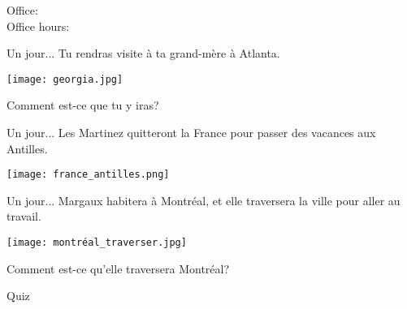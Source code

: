 \documentclass{beamer}
\subtitle[Voyages et futur simple]{Les voyages et le futur simple}
\begin{document}
  \begin{frame}
    \titlepage
    \tiny{Office: \\
          Office hours: }
  \end{frame}

  \begin{frame}[t]{Un jour...}
    Tu rendras visite à ta grand-mère à Atlanta.
    \begin{center}
      \texttt{[image: georgia.jpg]}
    \end{center}
    Comment est-ce que tu y iras?
  \end{frame}

  \begin{frame}[t]{Un jour...}
    Les Martinez quitteront la France pour passer des vacances aux Antilles.
    \begin{center}
      \texttt{[image: france\_antilles.png]}
    \end{center}
  \end{frame}

  \begin{frame}[t]{Un jour...}
    Margaux habitera à Montréal, et elle traversera la ville pour aller au travail.
    \begin{center}
      \texttt{[image: montréal\_traverser.jpg]}
    \end{center}
    Comment est-ce qu'elle traversera Montréal?
  \end{frame}

  \begin{frame}{}
    \begin{center}
      \Large Quiz
    \end{center}
  \end{frame}
\end{document}
